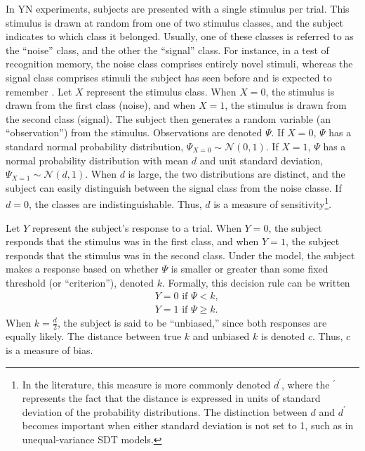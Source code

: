 \documentclass[man]{apa6}
\begin{document}
In YN experiments, subjects are presented with a single stimulus per trial. This stimulus is drawn at random from one of two stimulus classes, and the subject indicates to which class it belonged. Usually, one of these classes is referred to as the ``noise'' class, and the other the ``signal'' class. For instance, in a test of recognition memory, the noise class comprises entirely novel stimuli, whereas the signal class comprises stimuli the subject has seen before and is expected to remember \parencite[e.g.][]{Wixted2007}. Let $X$ represent the stimulus class. When $X=0$, the stimulus is drawn from the first class (noise), and when $X=1$, the stimulus is drawn from the second class (signal). The subject then generates a random variable (an ``observation'') from the stimulus. Observations are denoted $\Psi$. If $X=0$, $\Psi$ has a standard normal probability distribution, $\Psi_{X=0}\sim{}\mathcal{N}\left(0,1\right)$. If $X=1$, $\Psi$ has a normal probability distribution with mean $d$ and unit standard deviation, $\Psi_{X=1}\sim{}\mathcal{N}\left(d,1\right)$. When $d$ is large, the two distributions are distinct, and the subject can easily distinguish between the signal class from the noise classe. If $d=0$, the classes are indistinguishable. Thus, $d$ is a measure of sensitivity\footnote{In the literature, this measure is more commonly denoted $d^\prime$, where the $^\prime$ represents the fact that the distance is expressed in units of standard deviation of the probability distributions. The distinction between $d$ and $d^\prime$ becomes important when either standard deviation is not set to 1, such as in unequal-variance SDT models.}.

Let $Y$ represent the subject's response to a trial. When $Y=0$, the subject responds that the stimulus was in the first class, and when $Y=1$, the subject responds that the stimulus was in the second class. Under the model, the subject makes a response based on whether $\Psi$ is smaller or greater than some fixed threshold (or ``criterion''), denoted $k$. Formally, this decision rule can be written
\begin{eqnarray*}
&Y=0\textrm{ if }\Psi<k\textrm{,}\\
&Y=1\textrm{ if }\Psi\ge{}k\textrm{.}
\end{eqnarray*}When $k=\frac{d}{2}$, the subject is said to be ``unbiased,'' since both responses are equally likely. The distance between true $k$ and unbiased $k$ is denoted $c$. Thus, $c$ is a measure of bias.
\end{document}
